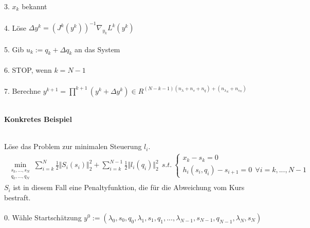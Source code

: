 \documentclass[12pt,a4paper]{article}
\begin{document}
  \\
  3. $ x_k $ bekannt \\
  \\
  4. Löse $\Delta y^{k} = (J^{k}(y^{k}))^{-1} \nabla_{y_k} L^{k}(y^{k})$ \\ 
  \\
  5. Gib $ u_k := q_k + \Delta q_k $ an das System \\
  \\
  6. STOP, wenn $ k = N-1 $ \\
  \\
  7. Berechne $ y^{k+1} = \prod ^{k+1} (y^{k} + \Delta y^{k}) \in R^{(N-k-1)(n_{\lambda}+n_{s}+n_{q})+ (n_{\lambda_N}+n_{s_N})} $ \\
  \\
  \newpage
  
  \begin{large}
  \textbf{Konkretes Beispiel}
  \end{large} \\
  Löse das Problem zur minimalen Steuerung $l_i $.
  \begin{align*}
  \min_{\begin{array}{c} s_{k},...,s_{N}\\ q_{k},...,q_{N} \end{array}} \sum_{i=k}^{N} \frac{1}{2} \Vert S_{i}(s_i) \Vert_{2}^{2} + \sum_{i=k}^{N-1} \frac{1}{2} \Vert l_i(q_{i})\Vert_{2}^{2} \ \  
  s.t. \ \left\lbrace \begin{array}{c}
  x_{k} - s_{k} = 0 \\
  h_i (s_i ,q_i ) - s_{i+1} = 0 \ \ \forall i = k, ... , N-1 \end{array} \right. 
  \end{align*}
  $ S_i $ ist in diesem Fall eine Penaltyfunktion, die für die Abweichung vom Kurs bestraft. \\
  \\
  0. Wähle Startschätzung $ y^{0} := (\lambda_{0},s_{0},q_{0},\lambda_{1},s_{1},q_{1}, ...,\lambda_{N-1},s_{N-1},q_{N-1},\lambda_{N},s_{N})$\\
  
\end{document}
